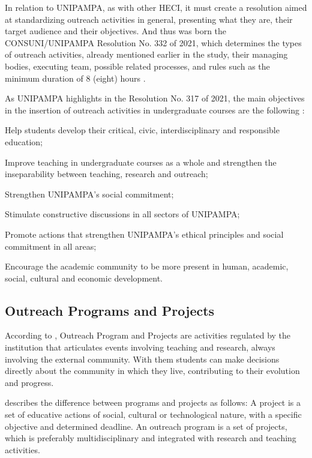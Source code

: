 In relation to \ac{UNIPAMPA}, as with other \ac{HECI}, it must create a resolution aimed at standardizing outreach activities in general, presenting what they are, their target audience and their objectives. And thus was born the CONSUNI/UNIPAMPA Resolution No. 332 of 2021, which determines the types of outreach activities, already mentioned earlier in the study, their managing bodies, executing team, possible related processes, and rules such as the minimum duration of 8 (eight) hours \cite{Resolucao-332:2021}.

As \ac{UNIPAMPA} highlights in the Resolution No. 317 of 2021, the main objectives in the insertion of outreach activities in undergraduate courses are the following \textcite{res317}:
\begin{inparaenum}[(i)]
  \item Help students develop their critical, civic, interdisciplinary and responsible education;
  \item Improve teaching in undergraduate courses as a whole and strengthen the inseparability between teaching, research and outreach;
  \item Strengthen \ac{UNIPAMPA}'s social commitment;
  \item Stimulate constructive discussions in all sectors of \ac{UNIPAMPA};
  \item Promote actions that strengthen \ac{UNIPAMPA}'s ethical principles and social commitment in all areas;
  \item Encourage the academic community to be more present in human, academic, social, cultural and economic development.
\end{inparaenum}

\subsection{Outreach Programs and Projects}\label{sec:bac-programs-projects}

According to \textcite{referenciaisPolitica}, Outreach Program and Projects are activities regulated by the institution that articulates events involving teaching and research, always involving the external community. With them students can make decisions directly about the community in which they live, contributing to their evolution and progress.

\textcite{Viero} describes the difference between programs and projects as follows: A project is a set of educative actions of social, cultural or technological nature, with a specific objective and determined deadline. An outreach program is a set of projects, which is preferably multidisciplinary and integrated with research and teaching activities.


